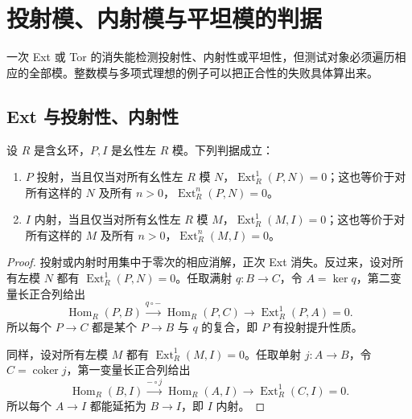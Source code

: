 
\section{投射模、内射模与平坦模的判据}
\label{b4:sec:0804}

一次 Ext 或 Tor 的消失能检测投射性、内射性或平坦性，但测试对象必须遍历相应的全部模。整数模与多项式理想的例子可以把正合性的失败具体算出来。


%
%

\subsection{Ext 与投射性、内射性}
\label{b4:subsec:0804:01}

\begin{theorem}\label{b4:thm:ext-projective-injective}
	设 \(R\) 是含幺环，\(P,I\) 是幺性左 \(R\) 模。下列判据成立：
	\begin{enumerate}
		\item \(P\) 投射，当且仅当对所有幺性左 \(R\) 模 \(N\)，\(\operatorname{Ext}_R^1(P,N)=0\)；这也等价于对所有这样的 \(N\) 及所有 \(n>0\)，\(\operatorname{Ext}_R^n(P,N)=0\)。
		\item \(I\) 内射，当且仅当对所有幺性左 \(R\) 模 \(M\)，\(\operatorname{Ext}_R^1(M,I)=0\)；这也等价于对所有这样的 \(M\) 及所有 \(n>0\)，\(\operatorname{Ext}_R^n(M,I)=0\)。
	\end{enumerate}
\end{theorem}
\begin{proof}
	投射或内射时用集中于零次的相应消解，正次 Ext 消失。反过来，设对所有左模 \(N\) 都有 \(\operatorname{Ext}_R^1(P,N)=0\)。任取满射 \(q:B\to C\)，令 \(A=\ker q\)，第二变量长正合列给出
	\[
		\operatorname{Hom}_R(P,B)\xrightarrow{q\circ-}\operatorname{Hom}_R(P,C) \longrightarrow\operatorname{Ext}_R^1(P,A)=0.
	\]
	所以每个 \(P\to C\) 都是某个 \(P\to B\) 与 \(q\) 的复合，即 \(P\) 有投射提升性质。

	同样，设对所有左模 \(M\) 都有 \(\operatorname{Ext}_R^1(M,I)=0\)。任取单射 \(j:A\to B\)，令 \(C=\operatorname{coker}j\)，第一变量长正合列给出
	\[
		\operatorname{Hom}_R(B,I)\xrightarrow{-\circ j}\operatorname{Hom}_R(A,I) \longrightarrow\operatorname{Ext}_R^1(C,I)=0.
	\]
	所以每个 \(A\to I\) 都能延拓为 \(B\to I\)，即 \(I\) 内射。
\end{proof}

